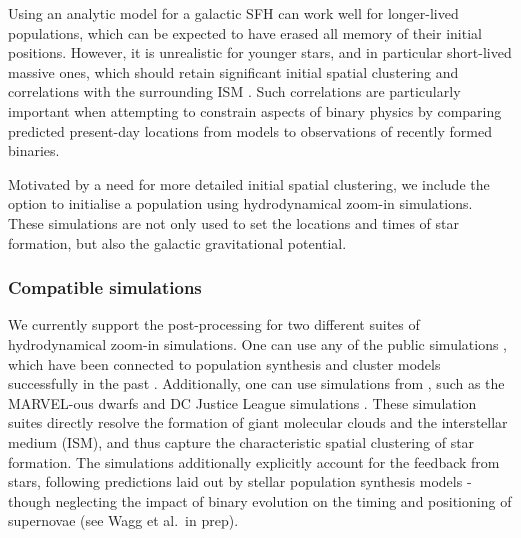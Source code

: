 \documentclass[twocolumn, twocolappendix, oneside]{aastex631}
\begin{document}
Using an analytic model for a galactic SFH can work well for longer-lived populations, which can be expected to have erased all memory of their initial positions. However, it is unrealistic for younger stars, and in particular short-lived massive ones, which should retain significant initial spatial clustering and correlations with the surrounding ISM \citep[e.g.,][]{Sarbadhicary+2023:2023arXiv231017694S}. Such correlations are particularly important when attempting to constrain aspects of binary physics by comparing predicted present-day locations from \cogsworth models to observations of recently formed binaries.%

Motivated by a need for more detailed initial spatial clustering, we include the option to initialise a \cogsworth population using hydrodynamical zoom-in simulations. These simulations are not only used to set the locations and times of star formation, but also the galactic gravitational potential. 

\subsubsection{Compatible simulations}

We currently support the post-processing for two different suites of hydrodynamical zoom-in simulations. One can use any of the public \fire simulations \citep{Wetzel+2016, Hopkins+2018:2018MNRAS.480..800H, Sanderson+2020}, which have been connected to population synthesis and cluster models successfully in the past \citep[e.g.,][]{Lamberts+2018:2018MNRAS.480.2704L, Chawla+2022:2022ApJ...931..107C, balls_of_FIRE_1, balls_of_FIRE_2, Thiele+2023:2023ApJ...945..162T}. Additionally, one can use simulations from \changa, such as the MARVEL-ous dwarfs and DC Justice League simulations \citep{Applebaum+2021:2021ApJ...906...96A, Christensen+2023:2023AAS...24140704C}. These simulation suites directly resolve the formation of giant molecular clouds and the interstellar medium (ISM), and thus capture the characteristic spatial clustering of star formation. The simulations additionally explicitly account for the feedback from stars, following predictions laid out by stellar population synthesis models - though neglecting the impact of binary evolution on the timing and positioning of supernovae (see Wagg et al.\ in prep).
\end{document}
